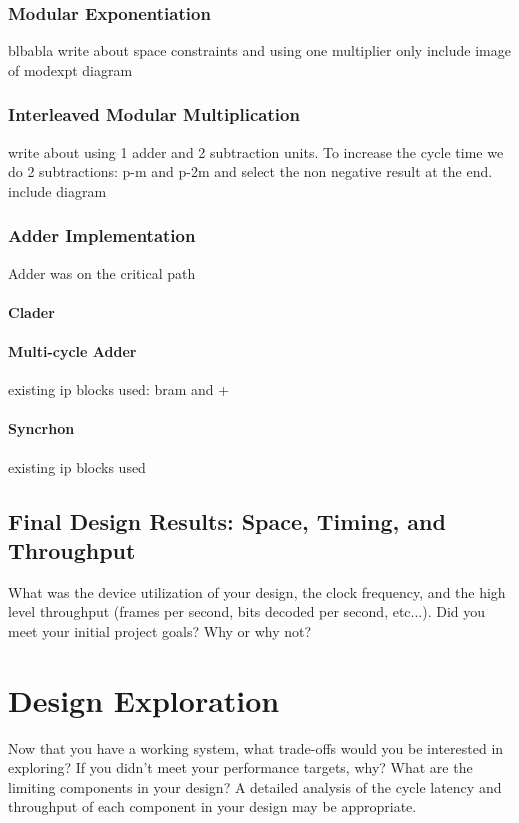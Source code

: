 \documentclass[a4paper,11pt]{report}
\begin{document}
\subsection{Modular Exponentiation}
blbabla write about space constraints and using one multiplier only
include image of modexpt diagram
\subsection{Interleaved Modular Multiplication}
write about using 1 adder and 2 subtraction units. 
To increase the cycle time we do 2 subtractions: p-m and p-2m and select the non negative result at the end.
include diagram
\subsection{Adder Implementation}
Adder was on the critical path
\subsubsection{Clader}
\subsubsection{Multi-cycle Adder}
existing ip blocks used: bram and +
\subsubsection{Syncrhon}
existing ip blocks used



\section{Final Design Results: Space, Timing, and Throughput}
What was the device utilization of your design, the clock frequency, and the
high level throughput (frames per second, bits decoded per second, etc...). Did you meet your
initial project goals? Why or why not?


\chapter*{Design Exploration}
 Now that you have a working system, what trade-offs would you be interested
in exploring?
If you didn’t meet your performance targets, why? What are the limiting components in
your design? A detailed analysis of the cycle latency and throughput of each component in
your design may be appropriate. 
\end{document}
